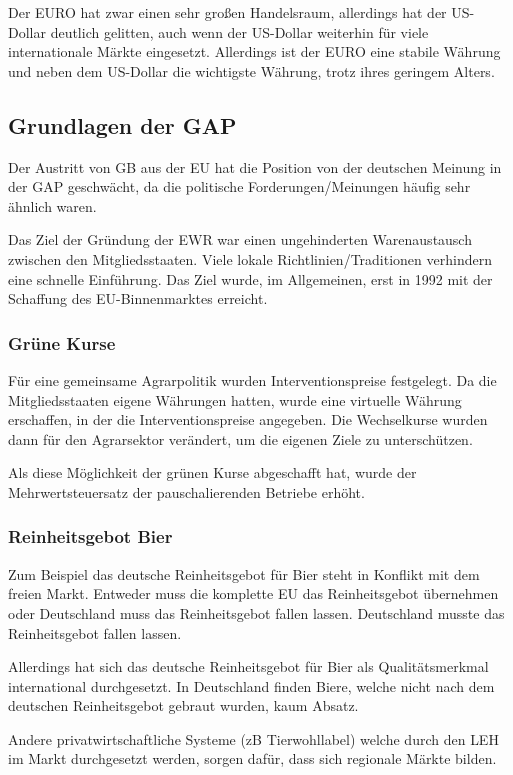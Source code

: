 \documentclass[11pt]{scrbook}
\begin{document}
Der EURO hat zwar einen sehr großen Handelsraum, allerdings hat der US-Dollar deutlich gelitten, auch wenn der US-Dollar weiterhin für viele internationale Märkte eingesetzt.
Allerdings ist der EURO eine stabile Währung und  neben dem US-Dollar die wichtigste Währung, trotz ihres geringem Alters.

\subsection{Grundlagen der \ac{GAP}}

Der Austritt von \ac{GB} aus der \ac{EU} hat die Position von der deutschen Meinung in der \ac{GAP} geschwächt, da die politische Forderungen/Meinungen häufig sehr ähnlich waren.

Das Ziel der Gründung der \ac{EWR} war einen ungehinderten Warenaustausch zwischen den Mitgliedsstaaten.
Viele lokale Richtlinien/Traditionen verhindern eine schnelle Einführung.
Das Ziel wurde, im Allgemeinen, erst in 1992 mit der Schaffung des \ac{EU}-Binnenmarktes erreicht.

\subsubsection{Grüne Kurse}
Für eine gemeinsame Agrarpolitik wurden Interventionspreise festgelegt.
Da die Mitgliedsstaaten eigene Währungen hatten, wurde eine virtuelle Währung erschaffen, in der die Interventionspreise angegeben.
Die Wechselkurse wurden dann für den Agrarsektor verändert, um die eigenen Ziele zu unterschützen.

Als diese Möglichkeit der grünen Kurse abgeschafft hat, wurde der Mehrwertsteuersatz der pauschalierenden Betriebe erhöht.

\subsubsection{Reinheitsgebot Bier}
Zum Beispiel das deutsche Reinheitsgebot für Bier steht in Konflikt mit dem freien Markt.
Entweder muss die komplette \ac{EU} das Reinheitsgebot übernehmen oder Deutschland muss das Reinheitsgebot fallen lassen.
Deutschland musste das Reinheitsgebot fallen lassen.

Allerdings hat sich das deutsche Reinheitsgebot für Bier als Qualitätsmerkmal international durchgesetzt.
In Deutschland finden Biere, welche nicht nach dem deutschen Reinheitsgebot gebraut wurden, kaum Absatz.

Andere privatwirtschaftliche Systeme (zB Tierwohllabel) welche durch den \ac{LEH} im Markt durchgesetzt werden, sorgen dafür, dass sich regionale Märkte bilden.
\end{document}
